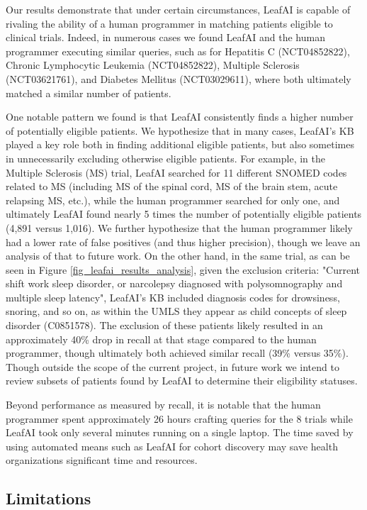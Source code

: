 \documentclass[../main.tex]{subfiles}
\begin{document}
Our results demonstrate that under certain circumstances, LeafAI is capable of rivaling the ability of a human programmer in matching patients eligible to clinical trials. Indeed, in numerous cases we found LeafAI and the human programmer executing similar queries, such as for Hepatitis C (NCT04852822), Chronic Lymphocytic Leukemia (NCT04852822), Multiple Sclerosis (NCT03621761), and Diabetes Mellitus (NCT03029611), where both ultimately matched a similar number of patients.

One notable pattern we found is that LeafAI consistently finds a higher number of potentially eligible patients. We hypothesize that in many cases, LeafAI's KB played a key role both in finding additional eligible patients, but also sometimes in unnecessarily excluding otherwise eligible patients. For example, in the Multiple Sclerosis (MS) trial, LeafAI searched for 11 different SNOMED codes related to MS (including MS of the spinal cord, MS of the brain stem, acute relapsing MS, etc.), while the human programmer searched for only one, and ultimately LeafAI found nearly 5 times the number of potentially eligible patients (4,891 versus 1,016). We further hypothesize that the human programmer likely had a lower rate of false positives (and thus higher precision), though we leave an analysis of that to future work. On the other hand, in the same trial, as can be seen in Figure \ref{fig_leafai_results_analysis}, given the exclusion criteria: "Current shift work sleep disorder, or narcolepsy diagnosed with polysomnography and multiple sleep latency", LeafAI's KB included diagnosis codes for drowsiness, snoring, and so on, as within the UMLS they appear as child concepts of sleep disorder (C0851578). The exclusion of these patients likely resulted in an approximately 40\% drop in recall at that stage compared to the human programmer, though ultimately both achieved similar recall (39\% versus 35\%). Though outside the scope of the current project, in future work we intend to review subsets of patients found by LeafAI to determine their eligibility statuses. 

Beyond performance as measured by recall, it is notable that the human programmer spent approximately 26 hours crafting queries for the 8 trials while LeafAI took only several minutes running on a single laptop. The time saved by using automated means such as LeafAI for cohort discovery may save health organizations significant time and resources.

\subsection*{Limitations}
\end{document}
